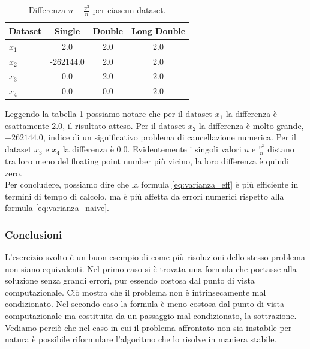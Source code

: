 \documentclass[letterpaper, 12pt]{article}
\numberwithin{equation}{section}    %
\begin{document}
\begin{table}[!ht]
\centering
\caption{Differenza \( u - \frac{v^2}{n} \) per ciascun dataset.}
\label{tab:errore_varianza}
\begin{tabular}{|l|c|c|c|}
\hline
\textbf{Dataset} & \textbf{Single} & \textbf{Double} & \textbf{Long Double} \\
\hline
$x_1$ & 2.0       & 2.0 & 2.0 \\
$x_2$ & -262144.0 & 2.0 & 2.0 \\
$x_3$ & 0.0       & 2.0 & 2.0 \\
$x_4$ & 0.0       & 0.0 & 2.0 \\
\hline
\end{tabular}
\end{table}

Leggendo la tabella \ref{tab:errore_varianza} possiamo notare che per il dataset $x_1$ la differenza è esattamente
$2.0$, il risultato atteso. Per il dataset $x_2$ la differenza è molto grande, $-262144.0$, indice di un
significativo problema di cancellazione numerica. Per il dataset $x_3$ e $x_4$ la differenza è $0.0$. Evidentemente 
i singoli valori \( u  \text{ e } \frac{v^2}{n} \) distano tra loro meno del floating point number più vicino, 
la loro differenza è quindi zero. \\
Per concludere, possiamo dire che la formula \ref{eq:varianza_eff} è più efficiente in termini di tempo di calcolo,
ma è più affetta da errori numerici rispetto alla formula \ref{eq:varianza_naive}.

\subsubsection{Conclusioni}
L'esercizio svolto è un buon esempio di come più risoluzioni dello stesso problema non siano equivalenti.
Nel primo caso si è trovata una formula che portasse alla soluzione senza grandi errori, pur essendo costosa dal
punto di vista computazionale. Ciò mostra che il problema non è intrinsecamente mal condizionato. Nel secondo 
caso la formula è meno costosa dal punto di vista computazionale ma costituita da un passaggio mal condizionato,
la sottrazione. Vediamo perciò che nel caso in cui il problema affrontato non sia instabile per natura
è possibile riformulare l'algoritmo che lo risolve in maniera stabile.
\end{document}
